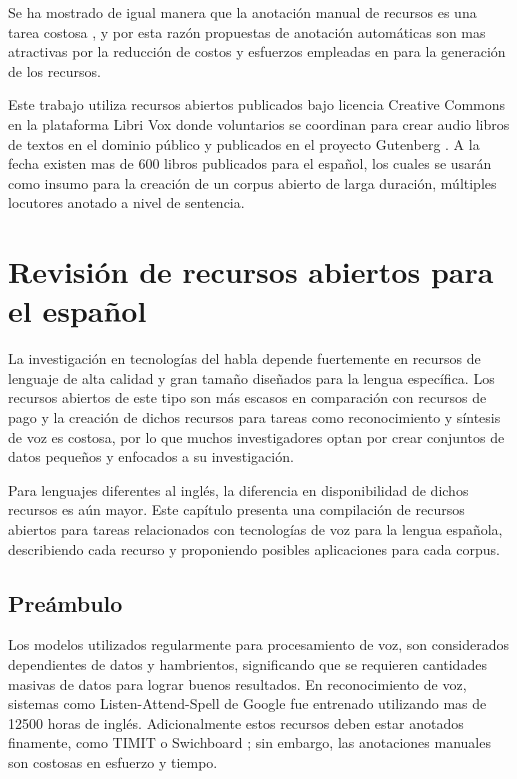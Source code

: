 \documentclass[a4paper,12pt,twoside]{report}
\begin{document}
Se ha mostrado de igual manera que la anotación manual de recursos es una tarea costosa \cite{googleTTSLatinAmericanSpanishCorpus}, y por esta razón propuestas de anotación automáticas son mas atractivas por la reducción de costos y esfuerzos empleadas en para la generación de los recursos.

Este trabajo utiliza recursos abiertos publicados bajo licencia Creative Commons en la plataforma Libri Vox \cite{LibriVox} donde voluntarios se coordinan para crear audio libros de textos en el dominio público y publicados en el proyecto Gutenberg \cite{gutenberg}. A la fecha existen mas de 600 libros publicados para el español, los cuales se usarán como insumo para la creación de un corpus abierto de larga duración, múltiples locutores anotado a nivel de sentencia.

\chapter{Revisión de recursos abiertos para el español}

La investigación en tecnologías del habla depende fuertemente en recursos de lenguaje de alta calidad y gran tamaño diseñados para la lengua específica. Los recursos abiertos de este tipo son más escasos en comparación con recursos de pago y la creación de dichos recursos para tareas como reconocimiento y síntesis de voz es costosa, por lo que muchos investigadores optan por crear conjuntos de datos pequeños y enfocados a su investigación.

Para lenguajes diferentes al inglés, la diferencia en disponibilidad de dichos recursos es aún mayor. Este capítulo presenta una compilación de recursos abiertos para tareas relacionados con tecnologías de voz para la lengua española, describiendo cada recurso y proponiendo posibles aplicaciones para cada corpus.

\section{Preámbulo}

Los modelos utilizados regularmente para procesamiento de voz, son considerados dependientes de datos y hambrientos, significando que se requieren cantidades masivas de datos para lograr buenos resultados. En reconocimiento de voz, sistemas como Listen-Attend-Spell de Google \cite{Chiu2018} fue entrenado utilizando mas de 12500 horas de inglés. Adicionalmente estos recursos deben estar anotados finamente, como TIMIT \cite{TIMIT} o Swichboard \cite{Switchboard}; sin embargo, las anotaciones manuales son costosas en esfuerzo y tiempo.
\end{document}
